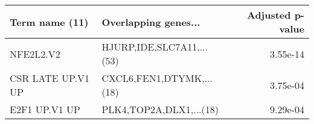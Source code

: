 \begin{tabular}{llr}
\toprule
   Term name (11) &      Overlapping genes... &  Adjusted p-value \\
\midrule
        NFE2L2.V2 & HJURP,IDE,SLC7A11,...(53) &          3.55e-14 \\
CSR LATE UP.V1 UP &  CXCL6,FEN1,DTYMK,...(18) &          3.75e-04 \\
    E2F1 UP.V1 UP &   PLK4,TOP2A,DLX1,...(18) &          9.29e-04 \\
\bottomrule
\end{tabular}
